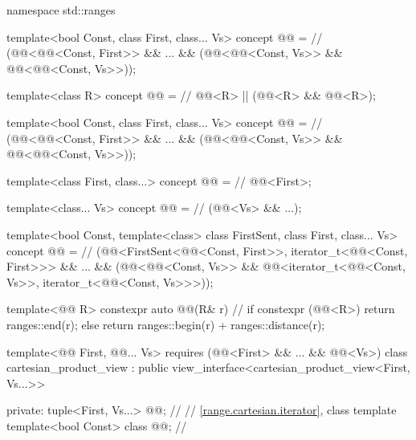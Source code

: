 \begin{codeblock}
namespace std::ranges {
  template<bool Const, class First, class... Vs>
  concept @@ =          // \expos
    (@@<@@<Const, First>> && ... &&
      (@@<@@<Const, Vs>>
        && @@<@@<Const, Vs>>));

  template<class R>
  concept @@ =                // \expos
    @@<R> || (@@<R> && @@<R>);

  template<bool Const, class First, class... Vs>
  concept @@ =          // \expos
    (@@<@@<Const, First>> && ... &&
      (@@<@@<Const, Vs>>
        && @@<@@<Const, Vs>>));

  template<class First, class...>
  concept @@ =                 // \expos
    @@<First>;

  template<class... Vs>
  concept @@ =                  // \expos
    (@@<Vs> && ...);

  template<bool Const, template<class> class FirstSent, class First, class... Vs>
    concept @@ =               // \expos
      (@@<FirstSent<@@<Const, First>>,
          iterator_t<@@<Const, First>>> && ...
        && (@@<@@<Const, Vs>>
          && @@<iterator_t<@@<Const, Vs>>,
              iterator_t<@@<Const, Vs>>>));

  template<@@ R>
  constexpr auto @@(R& r) {       // \expos
    if constexpr (@@<R>) {
      return ranges::end(r);
    } else {
      return ranges::begin(r) + ranges::distance(r);
    }
  }

  template<@@ First, @@... Vs>
    requires (@@<First> && ... && @@<Vs>)
  class cartesian_product_view : public view_interface<cartesian_product_view<First, Vs...>> {
  private:
    tuple<First, Vs...> @@;                 // \expos
    // \ref{range.cartesian.iterator}, class template 
    template<bool Const> class @@;       // \expos

}}
\end{codeblock}
